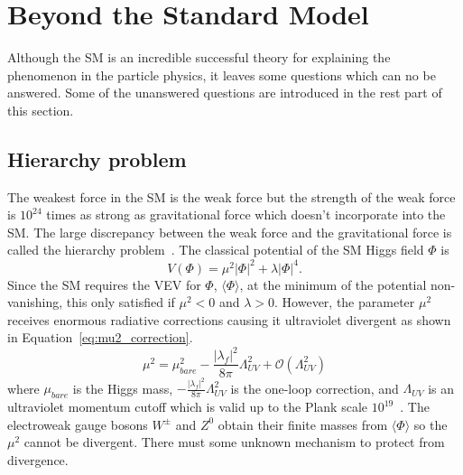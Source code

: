 
\section{Beyond the Standard Model}
\label{sec:sm_bsm}
Although the SM is an incredible successful theory for explaining the phenomenon in the particle physics, it leaves some questions which can no be answered.
Some of the unanswered questions are introduced in the rest part of this section.


\subsection{Hierarchy problem}
\label{subsec:sm_hierarchy_problem}
The weakest force in the SM is the weak force but the strength of the weak force is $10^{24}$ times as strong as gravitational force which doesn't incorporate into the SM.
The large discrepancy between the weak force and the gravitational force is called the hierarchy problem~\cite{Martin:1997ns,PhysLettB.452.28,maarten_brak}.
The classical potential of the SM Higgs field $\Phi$ is
%
\begin{equation}
V(\Phi) = \mu^{2} |\Phi|^2 + \lambda |\Phi|^4.
\end{equation}
%
Since the SM requires the VEV for $\Phi$, $\langle \Phi \rangle$, at the minimum of the potential non-vanishing, this only satisfied if $\mu^{2} < 0$ and $\lambda > 0$.
However, the parameter $\mu^{2}$ receives enormous radiative corrections causing it ultraviolet divergent as shown in Equation~\ref{eq:mu2_correction}.
%
\begin{equation}
\mu^{2} = \mu_{bare}^{2} - \frac{|\lambda_{f}|^{2}}{8\pi}\Lambda_{UV}^{2} + \mathcal{O}(\Lambda_{UV}^{2})
\label{eq:mu2_correction}
\end{equation}
%
where $\mu_{bare}$ is the Higgs mass, $- \frac{|\lambda_{f}|^{2}}{8\pi}\Lambda_{UV}^{2}$ is the one-loop correction, and $\Lambda_{UV}$ is an ultraviolet momentum cutoff which is valid up to the Plank scale $10^{19}$~{\GeV}.
The electroweak gauge bosons $W^{\pm}$ and $Z^{0}$ obtain their finite masses from $\langle \Phi \rangle$ so the $\mu^{2}$ cannot be divergent.
There must some unknown mechanism to protect from divergence.


